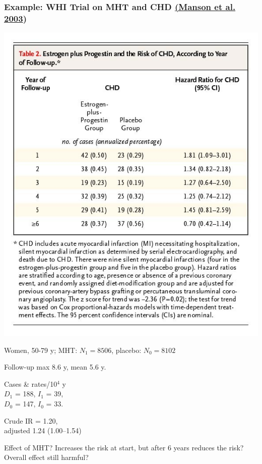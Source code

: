 \documentclass[12pt,dvipsnames,t,aspectratio=169, handout%
]{beamer}
\begin{document}
\begin{frame}
\frametitle{\large Example: WHI Trial on MHT and CHD 
{\small\href{https://doi.org/10.1056/NEJMoa030808}{(Manson et al. 2003}) } } 

\begin{minipage} {0.55\linewidth}
\includegraphics[height=1.1\textheight]{Manson-table2}
\end{minipage}
\hfill
\begin{minipage} {0.44\linewidth}
{\small\raggedright
\bi
\item
Women, 50-79 y;  
 MHT: $N_1=8506$, placebo: $N_0=8102$
\item 
Follow-up max 8.6 y, mean 5.6 y.
\item
Cases \& rates/10$^4$ y \\
$D_1$ = 188, $I_1$ = 39, \\
$D_0$ = 147, $I_0$ = 33.
\item
Crude IR = 1.20, \\
adjusted 1.24 (1.00--1.54)
\item
Effect of MHT? Increases the risk at start, but after 6 years
reduces the risk? Overall effect still harmful?
\ei
}

\end{minipage}

\end{frame}
\end{document}

